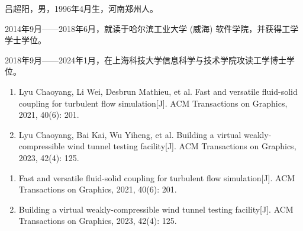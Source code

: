 \documentclass[doctor]{shtthesis}
\makeatletter
\def\ifgraduate{\ifsht@graduate}
\makeatother
\begin{document}
\maketitle

\frontmatter


\makeindices

\ifgraduate

\fi

\mainmatter






\makebiblio

\backmatter


\ifgraduate
\begin{resume}
  吕超阳，男，1996年4月生，河南郑州人。

  2014年9月——2018年6月，就读于哈尔滨工业大学 (威海) 软件学院，并获得工学学士学位。

  2018年9月——2024年1月，在上海科技大学信息科学与技术学院攻读工学博士学位。  
\end{resume}

\begin{publications}
  \begin{enumerate}
    \item Lyu Chaoyang, Li Wei, Desbrun Mathieu, et al. Fast and versatile fluid-solid coupling for turbulent flow simulation[J]. ACM Transactions on Graphics, 2021, 40(6): 201.
    \item Lyu Chaoyang, Bai Kai, Wu Yiheng, et al. Building a virtual weakly-compressible wind tunnel testing facility[J]. ACM Transactions on Graphics, 2023, 42(4): 125.
  \end{enumerate}
\end{publications}

\begin{publications*}
  \begin{enumerate}
    \item Fast and versatile fluid-solid coupling for turbulent flow simulation[J]. ACM Transactions on Graphics, 2021, 40(6): 201.
    \item Building a virtual weakly-compressible wind tunnel testing facility[J]. ACM Transactions on Graphics, 2023, 42(4): 125.
  \end{enumerate}
\end{publications*}



\fi
\end{document}
